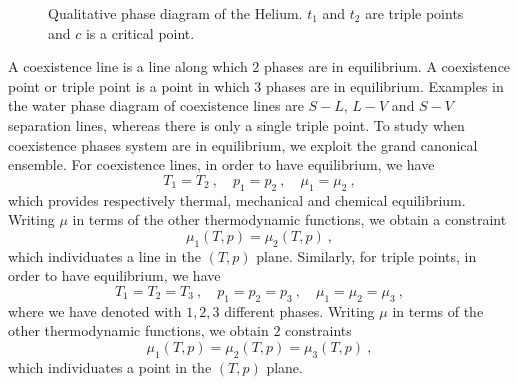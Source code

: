     \begin{figure}[h!]
        \centering
        \caption{Qualitative phase diagram of the Helium. $t_1$ and $t_2$ are triple points and $c$ is a critical point.}
        \label{fig:phhelium}
    \end{figure} 

    A coexistence line is a line along which $2$ phases are in equilibrium. A coexistence point or triple point is a point in which $3$ phases are in equilibrium. Examples in the water phase diagram of coexistence lines are $S-L$, $L-V$ and $S-V$ separation lines, whereas there is only a single triple point. To study when coexistence phases system are in equilibrium, we exploit the grand canonical ensemble. For coexistence lines, in order to have equilibrium, we have
    \begin{equation*}
        T_1 = T_2 ~, \quad p_1 = p_2 ~, \quad \mu_1 = \mu_2 ~,
    \end{equation*}
    which provides respectively thermal, mechanical and chemical equilibrium. Writing $\mu$ in terms of the other thermodynamic functions, we obtain a constraint 
    \begin{equation*}
        \mu_1(T,p) = \mu_2(T,p) ~,
    \end{equation*}
    which individuates a line in the $(T, p)$ plane. Similarly, for triple points, in order to have equilibrium, we have
    \begin{equation*}
        T_1 = T_2 = T_3 ~, \quad p_1 = p_2 = p_3 ~, \quad \mu_1 = \mu_2 = \mu_3 ~,
    \end{equation*}
    where we have denoted with $1,2,3$ different phases. Writing $\mu$ in terms of the other thermodynamic functions, we obtain $2$ constraints
    \begin{equation*}
        \mu_1(T,p) = \mu_2(T,p) = \mu_3(T,p) ~,
    \end{equation*}
    which individuates a point in the $(T, p)$ plane.

